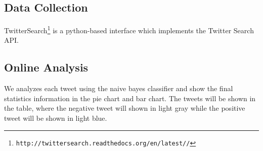 \documentclass{article}
\begin{document}
\subsection{Data Collection}
TwitterSearch\footnote{\texttt{\scriptsize{http://twittersearch.readthedocs.org/en/latest//‎‎}}} is a python-based interface which implements the Twitter Search API. 
\subsection{Online Analysis}
We analyzes each tweet using the naive bayes classifier and show the final statistics information in the pie chart and bar chart. The tweets will be shown in the table, where the negative tweet will shown in light gray while the positive tweet will be shown in light blue.

\cite{agarwal2011sentiment}



\end{document}
